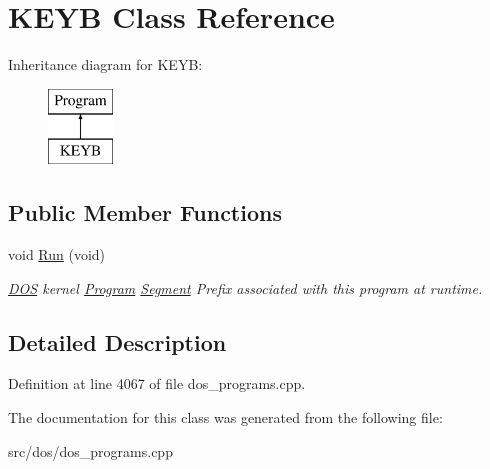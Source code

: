 \hypertarget{classKEYB}{\section{K\-E\-Y\-B Class Reference}
\label{classKEYB}
}
Inheritance diagram for K\-E\-Y\-B\-:\begin{figure}[H]
\begin{center}
\leavevmode
\includegraphics[height=2.000000cm]{classKEYB}
\end{center}
\end{figure}
\subsection*{Public Member Functions}
\begin{DoxyCompactItemize}
\item 
\hypertarget{classKEYB_a0ddb778460bbba0ce194908d8a405d24}{void \hyperlink{classKEYB_a0ddb778460bbba0ce194908d8a405d24}{Run} (void)}\label{classKEYB_a0ddb778460bbba0ce194908d8a405d24}

\begin{DoxyCompactList}\small\item\em \hyperlink{classDOS}{D\-O\-S} kernel \hyperlink{classProgram}{Program} \hyperlink{structSegment}{Segment} Prefix associated with this program at runtime. \end{DoxyCompactList}\end{DoxyCompactItemize}


\subsection{Detailed Description}


Definition at line 4067 of file dos\-\_\-programs.\-cpp.



The documentation for this class was generated from the following file\-:\begin{DoxyCompactItemize}
\item 
src/dos/dos\-\_\-programs.\-cpp\end{DoxyCompactItemize}
